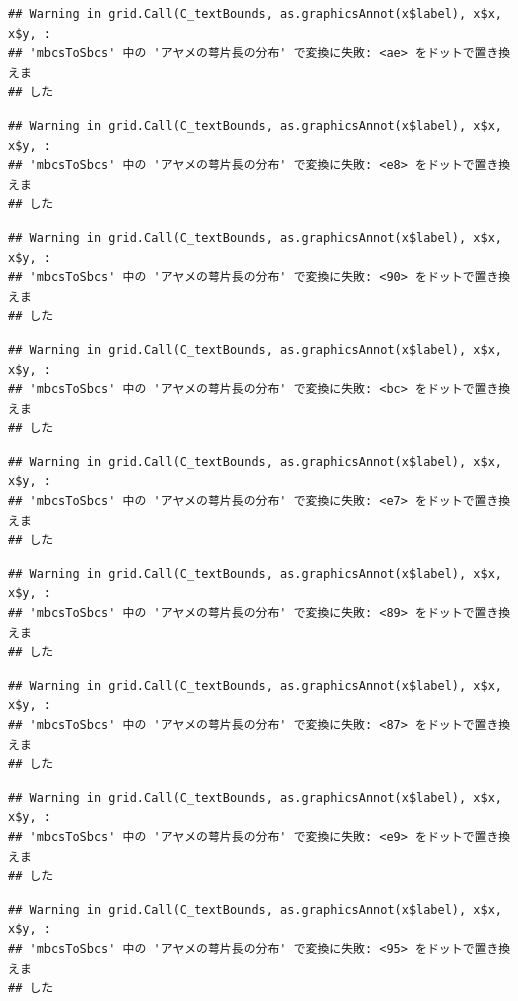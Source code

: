 \documentclass[
]{book}
\begin{document}
\begin{verbatim}
## Warning in grid.Call(C_textBounds, as.graphicsAnnot(x$label), x$x, x$y, :
## 'mbcsToSbcs' 中の 'アヤメの萼片長の分布' で変換に失敗: <ae> をドットで置き換えま
## した
\end{verbatim}

\begin{verbatim}
## Warning in grid.Call(C_textBounds, as.graphicsAnnot(x$label), x$x, x$y, :
## 'mbcsToSbcs' 中の 'アヤメの萼片長の分布' で変換に失敗: <e8> をドットで置き換えま
## した
\end{verbatim}

\begin{verbatim}
## Warning in grid.Call(C_textBounds, as.graphicsAnnot(x$label), x$x, x$y, :
## 'mbcsToSbcs' 中の 'アヤメの萼片長の分布' で変換に失敗: <90> をドットで置き換えま
## した
\end{verbatim}

\begin{verbatim}
## Warning in grid.Call(C_textBounds, as.graphicsAnnot(x$label), x$x, x$y, :
## 'mbcsToSbcs' 中の 'アヤメの萼片長の分布' で変換に失敗: <bc> をドットで置き換えま
## した
\end{verbatim}

\begin{verbatim}
## Warning in grid.Call(C_textBounds, as.graphicsAnnot(x$label), x$x, x$y, :
## 'mbcsToSbcs' 中の 'アヤメの萼片長の分布' で変換に失敗: <e7> をドットで置き換えま
## した
\end{verbatim}

\begin{verbatim}
## Warning in grid.Call(C_textBounds, as.graphicsAnnot(x$label), x$x, x$y, :
## 'mbcsToSbcs' 中の 'アヤメの萼片長の分布' で変換に失敗: <89> をドットで置き換えま
## した
\end{verbatim}

\begin{verbatim}
## Warning in grid.Call(C_textBounds, as.graphicsAnnot(x$label), x$x, x$y, :
## 'mbcsToSbcs' 中の 'アヤメの萼片長の分布' で変換に失敗: <87> をドットで置き換えま
## した
\end{verbatim}

\begin{verbatim}
## Warning in grid.Call(C_textBounds, as.graphicsAnnot(x$label), x$x, x$y, :
## 'mbcsToSbcs' 中の 'アヤメの萼片長の分布' で変換に失敗: <e9> をドットで置き換えま
## した
\end{verbatim}

\begin{verbatim}
## Warning in grid.Call(C_textBounds, as.graphicsAnnot(x$label), x$x, x$y, :
## 'mbcsToSbcs' 中の 'アヤメの萼片長の分布' で変換に失敗: <95> をドットで置き換えま
## した
\end{verbatim}
\end{document}
